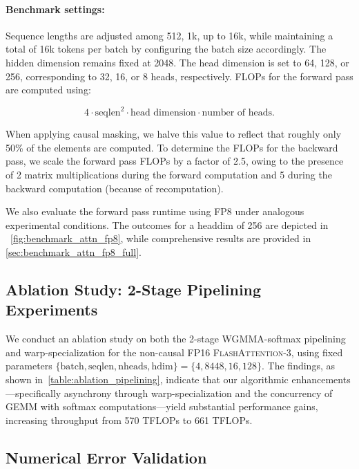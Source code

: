 \begin{enumerate}
\begin{itemize}
\paragraph{Benchmark settings:} Sequence lengths are adjusted among 512, 1k, up to 16k, while maintaining a total of 16k tokens per batch by configuring the batch size accordingly. The hidden dimension remains fixed at 2048. The head dimension is set to 64, 128, or 256, corresponding to 32, 16, or 8 heads, respectively. FLOPs for the forward pass are computed using:

\begin{equation*}
  4 \cdot \text{seqlen}^2 \cdot \text{head dimension} \cdot \text{number of heads}.
\end{equation*}

When applying causal masking, we halve this value to reflect that roughly only 50\% of the elements are computed. To determine the FLOPs for the backward pass, we scale the forward pass FLOPs by a factor of 2.5, owing to the presence of 2 matrix multiplications during the forward computation and 5 during the backward computation (because of recomputation).

We also evaluate the forward pass runtime using FP8 under analogous experimental conditions. The outcomes for a headdim of 256 are depicted in ~\cref{fig:benchmark_attn_fp8}, while comprehensive results are provided in \cref{sec:benchmark_attn_fp8_full}.

\subsection{Ablation Study: 2-Stage Pipelining Experiments}
\label{sec:2-stage-pipelining-experiments}

We conduct an ablation study on both the 2-stage WGMMA-softmax pipelining and warp-specialization for the non-causal FP16 \textsc{FlashAttention-3}, using fixed parameters $\{\text{batch}, \text{seqlen}, \text{nheads}, \text{hdim}\} = \{ 4, 8448, 16, 128\}$. The findings, as shown in~\cref{table:ablation_pipelining}, indicate that our algorithmic enhancements—specifically asynchrony through warp-specialization and the concurrency of GEMM with softmax computations—yield substantial performance gains, increasing throughput from 570 TFLOPs to 661 TFLOPs.

\subsection{Numerical Error Validation}
\label{sec:numerical_error}


\end{itemize}
\end{enumerate}
